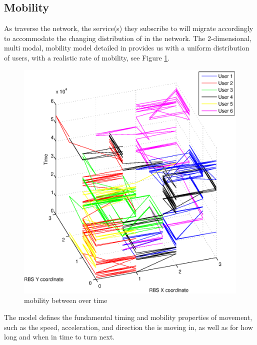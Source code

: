 \subsection{Mobility}
As \ues{} traverse the \xcloud{} network, the service(s) they subscribe to will migrate accordingly to accommodate the changing distribution of \ues{} in the network. The 2-dimensional, multi modal, mobility model detailed in \cite{bettstetter2001smooth} provides us with a uniform distribution of users, with a realistic rate of mobility, see Figure \ref{fig:mobility_distribution}.

\begin{figure}[tb]
	\centering
	\includegraphics[width=\linewidth]{user_mobility.eps} 
	\caption{\Ue mobility between \rbs{} over time}
	\label{fig:mobility_distribution}
\end{figure}

The model defines the fundamental timing and mobility properties of \ue{} movement, such as the speed, acceleration, and direction the \ue{} is moving in, as well as for how long and when in time to turn next. 